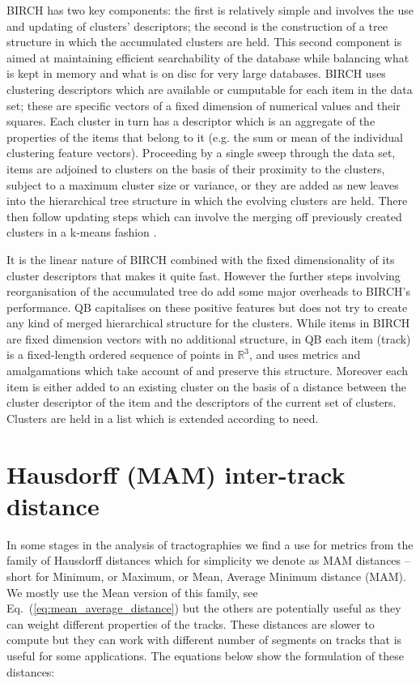 \documentclass[preprint,authoryear,a4paper,10pt,onecolumn]{elsarticle}
\begin{document}
\begin{appendices}
BIRCH has two key components: the first is relatively simple and
involves the use and updating of clusters' descriptors; the second is
the construction of a tree structure in which the accumulated clusters
are held. This second component is aimed at maintaining efficient
searchability of the database while balancing what is kept in memory and
what is on disc for very large databases. BIRCH uses clustering
descriptors which are available or cumputable for each item in the data
set; these are specific vectors of a fixed dimension of numerical values
and their squares. Each cluster in turn has a descriptor which is an
aggregate of the properties of the items that belong to it (e.g. the sum
or mean of the individual clustering feature vectors). Proceeding by a
single sweep through the data set, items are adjoined to clusters on the
basis of their proximity to the clusters, subject to a maximum cluster
size or variance, or they are added as new leaves into the hierarchical
tree structure in which the evolving clusters are held. There then
follow updating steps which can involve the merging off previously
created clusters in a k-means fashion \citep{steinhaus1956division,
  macqueen1967some}.

It is the linear nature of BIRCH combined with the fixed dimensionality
of its cluster descriptors that makes it quite fast. However the further
steps involving reorganisation of the accumulated tree do add some major
overheads to BIRCH's performance. QB capitalises on these positive
features but does not try to create any kind of merged hierarchical
structure for the clusters. While items in BIRCH are fixed dimension
vectors with no additional structure, in QB each item (track) is a
fixed-length ordered sequence of points in $\mathbb{R}^{3}$, and uses
metrics and amalgamations which take account of and preserve this
structure.  Moreover each item is either added to an existing cluster on
the basis of a distance between the cluster descriptor of the item and
the descriptors of the current set of clusters. Clusters are held in a
list which is extended according to need.

\section{Hausdorff (MAM) inter-track distance}

In some stages in the analysis of tractographies we find a use for
metrics from the family of Hausdorff distances which for simplicity we
denote as MAM distances -- short for Minimum, or Maximum, or Mean,
Average Minimum distance (MAM). We mostly use the Mean version of this
family, see Eq.~(\ref{eq:mean_average_distance}) but the others are
potentially useful as they can weight different properties of the
tracks. These distances are slower to compute but they can work with
different number of segments on tracks that is useful for some
applications. The equations below show the formulation of these
distances:


\end{appendices}
\end{document}
